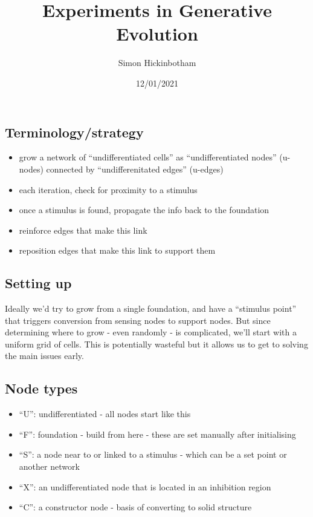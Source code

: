 \documentclass[]{article}
\title{Experiments in Generative Evolution}
\author{Simon Hickinbotham}
\date{12/01/2021}
\providecommand{\tightlist}{%
  \setlength{\itemsep}{0pt}\setlength{\parskip}{0pt}}
\begin{document}
\maketitle

\hypertarget{terminologystrategy}{%
\subsection{Terminology/strategy}\label{terminologystrategy}}

\begin{itemize}
\tightlist
\item
  grow a network of ``undifferentiated cells'' as ``undifferentiated
  nodes'' (u-nodes) connected by ``undifferenitated edges'' (u-edges)
\item
  each iteration, check for proximity to a stimulus
\item
  once a stimulus is found, propagate the info back to the foundation
\item
  reinforce edges that make this link
\item
  reposition edges that make this link to support them
\end{itemize}

\hypertarget{setting-up}{%
\subsection{Setting up}\label{setting-up}}

Ideally we'd try to grow from a single foundation, and have a ``stimulus
point'' that triggers conversion from sensing nodes to support nodes.
But since determining where to grow - even randomly - is complicated,
we'll start with a uniform grid of cells. This is potentially wasteful
but it allows us to get to solving the main issues early.

\hypertarget{node-types}{%
\subsection{Node types}\label{node-types}}

\begin{itemize}
\tightlist
\item
  ``U'': undifferentiated - all nodes start like this
\item
  ``F'': foundation - build from here - these are set manually after
  initialising
\item
  ``S'': a node near to or linked to a stimulus - which can be a set
  point or another network
\item
  ``X'': an undifferentiated node that is located in an inhibition
  region
\item
  ``C'': a constructor node - basis of converting to solid structure
\end{itemize}
\end{document}
